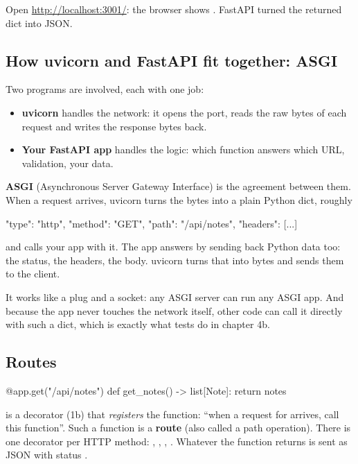 Open \url{http://localhost:3001/}: the browser shows . FastAPI turned the returned dict into JSON.

\subsection{How uvicorn and FastAPI fit together: ASGI}

Two programs are involved, each with one job:
\begin{itemize}
\item \textbf{uvicorn} handles the network: it opens the port, reads the raw bytes of each request and writes the response bytes back.
\item \textbf{Your FastAPI app} handles the logic: which function answers which URL, validation, your data.
\end{itemize}

\textbf{ASGI} (Asynchronous Server Gateway Interface) is the agreement between them. When a request arrives, uvicorn turns the bytes into a plain Python dict, roughly

\begin{py}
{"type": "http", "method": "GET", "path": "/api/notes", "headers": [...]}
\end{py}

and calls your app with it. The app answers by sending back Python data too: the status, the headers, the body. uvicorn turns that into bytes and sends them to the client.

It works like a plug and a socket: any ASGI server can run any ASGI app. And because the app never touches the network itself, other code can call it directly with such a dict, which is exactly what tests do in chapter 4b.

\subsection{Routes}

\begin{py}
@app.get("/api/notes")
def get_notes() -> list[Note]:
	return notes
\end{py}

 is a decorator (1b) that \emph{registers} the function: ``when a  request for  arrives, call this function''. Such a function is a \textbf{route} (also called a path operation). There is one decorator per HTTP method: , , , . Whatever the function returns is sent as JSON with status .

